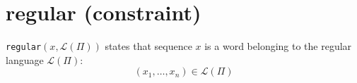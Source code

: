 \label{regular}
\hypertarget{regular}{}

\section{regular (constraint)}\label{regular:regularconstraint}\hypertarget{regular:regularconstraint}{}
\begin{notedef}
  \texttt{regular}$(x,\mathcal{L}(\Pi))$ states that sequence $x$ is a word belonging to the regular language $\mathcal{L}(\Pi)$:
$$(x_1,\ldots,x_n)\in\mathcal{L}(\Pi)$$
\end{notedef}

